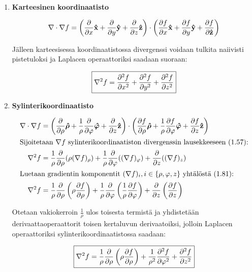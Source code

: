 \documentclass[../johdoksia.tex]{subfiles}
\begin{document}
	\begin{enumerate}
		\item \textbf{Karteesinen koordinaatisto}
		
		\begin{equation}
			\nabla\cdot\nabla f = \left(\pdv{}{x}\mathbf{\hat{x}} + \pdv{}{y}\mathbf{\hat{y}} + \pdv{}{z}\mathbf{\hat{z}}\right)\cdot\left(\pdv{f}{x}\mathbf{\hat{x}} + \pdv{f}{y}\mathbf{\hat{y}} + \pdv{f}{\mathbf{\hat{z}}}\right)
		\end{equation}
		
		\noindent Jälleen karteesisessa koordinaatistossa divergenssi voidaan tulkita naiivisti pistetuloksi ja Laplacen operaattoriksi saadaan suoraan:
		
		\begin{equation}
			\boxed{\nabla^2 f = \pdv{^2f}{x^2} + \pdv{^2f}{y^2} + \pdv{^2f}{z^2}}
		\end{equation}
		
		\item \textbf{Sylinterikoordinaatisto}
		
		\begin{align}
			\nabla\cdot\nabla f &= \left(\pdv{}{\rho}\boldsymbol{\hat{\rho}} + \frac{1}{\rho}\pdv{}{\varphi}\boldsymbol{\hat{\varphi}} + \pdv{}{z}\mathbf{\hat{z}}\right)\cdot\left(\pdv{f}{\rho}\boldsymbol{\hat{\rho}} + \frac{1}{\rho}\pdv{f}{\varphi}\boldsymbol{\hat{\varphi}} + \pdv{f}{z}\mathbf{\hat{z}}\right) \\
			\intertext{Sijoitetaan $\nabla f$ sylinterikoordinaatiston divergenssin lausekkeeseen (1.57):}
			\nabla^2 f &= \frac{1}{\rho}\pdv{}{\rho}(\rho(\nabla f)_\rho) + \frac{1}{\rho}\pdv{}{\varphi}((\nabla f)_\varphi) + \pdv{}{z}((\nabla f)_z) \\
			\intertext{Luetaan gradientin komponentit $(\nabla f)_i, i\in\{\rho, \varphi, z\}$ yhtälöstä (1.81):}
			\nabla^2 f &= \frac{1}{\rho}\pdv{}{\rho}\left(\rho\pdv{f}{\rho}\right) + \frac{1}{\rho}\pdv{}{\varphi}\left(\frac{1}{\rho}\pdv{f}{\varphi}\right) + \pdv{}{z}\left(\pdv{f}{z}\right)
		\end{align}
		
		\noindent Otetaan vakiokerroin $\frac{1}{\rho}$ ulos toisesta termistä ja yhdistetään derivaattaoperaattorit toisen kertaluvun derivaatoiksi, jolloin Laplacen operaattoriksi sylinterikoordinaatistossa saadaan:
		
		\begin{equation}
			\boxed{\nabla^2 f = \frac{1}{\rho}\pdv{}{\rho}\left(\rho\pdv{f}{\rho}\right) + \frac{1}{\rho^2}\pdv{^2f}{\varphi^2} + \pdv{^2f}{z^2}}
		\end{equation}
		

\end{enumerate}
\end{document}
